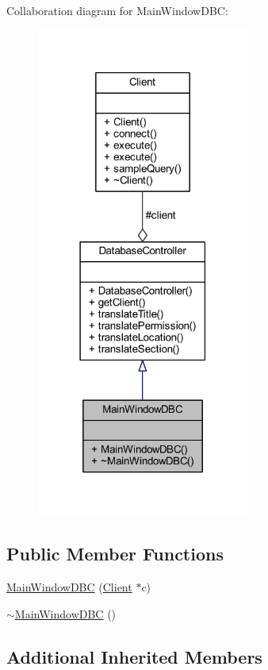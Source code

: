 Collaboration diagram for Main\+Window\+D\+B\+C\+:
\nopagebreak
\begin{figure}[H]
\begin{center}
\leavevmode
\includegraphics[width=198pt]{class_main_window_d_b_c__coll__graph}
\end{center}
\end{figure}
\subsection*{Public Member Functions}
\begin{DoxyCompactItemize}
\item 
\hyperlink{class_main_window_d_b_c_ab3686ecce9d1051a525689ff07ddac4e}{Main\+Window\+D\+B\+C} (\hyperlink{class_client}{Client} $\ast$c)
\item 
\hyperlink{class_main_window_d_b_c_a2910442b399e3bd968ceb8b3dd92ba69}{$\sim$\+Main\+Window\+D\+B\+C} ()
\end{DoxyCompactItemize}
\subsection*{Additional Inherited Members}



